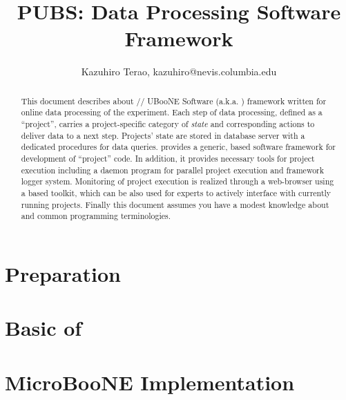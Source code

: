 \documentclass[a4paper,12pt]{report}
\begin{document}
\title{PUBS: Data Processing Software Framework}
\author{
  Kazuhiro Terao, kazuhiro@nevis.columbia.edu
}
\maketitle

\begin{abstract}
This document describes about {\python/\php/\psql} UBooNE Software (a.k.a. \pubs) framework
written for online data processing of the experiment. Each step of data processing, defined
as a ``project'', carries a project-specific category of {\it state} and corresponding 
actions to deliver data to a next step. Projects' state are stored in {\psql} database server
with a dedicated procedures for data queries. {\pubs} provides a generic, {\python} based software 
framework for development of ``project'' code. In addition, it provides necessary tools for
project execution including a daemon program for parallel project execution and framework logger
system. Monitoring of project execution is realized through a web-browser using a {\php} based 
toolkit, which can be also used for experts to actively interface with currently running projects.
Finally this document assumes you have a modest knowledge about {\python} and common programming 
terminologies. 
\end{abstract}

\tableofcontents

\newpage

\chapter{Preparation}
\label{prep}


\chapter{Basic of {\pubs}}
\label{pubs}


\chapter{MicroBooNE Implementation}
\label{dstream}





\end{document}
